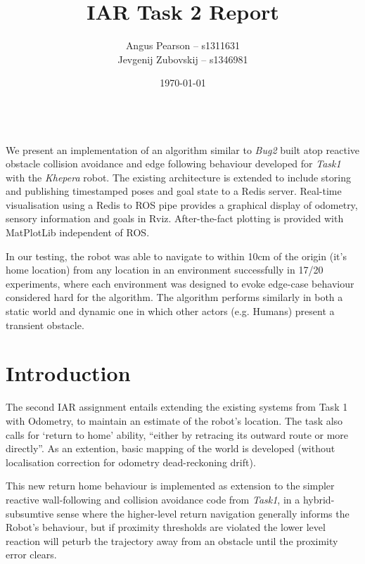 \documentclass[11pt, a4paper]{article}
\renewenvironment{abstract}{%
{\mdseries\scshape\Large\abstractname}
\vspace{1em}\\
}{\par\noindent}
\begin{document}
\title{IAR Task 2 Report}
\author{Angus Pearson -- s1311631\\ Jevgenij Zubovskij -- s1346981}
\date{\today}
\maketitle



\begin{abstract}
  We present an implementation of an algorithm similar to \textit{Bug2} \cite{principlesrobot} 
  built atop reactive obstacle collision avoidance and edge following behaviour developed for 
  \textit{Task1} with the \textit{Khepera} robot. The existing architecture is extended to
  include storing and publishing timestamped poses and goal state to a Redis \cite{Redis} server.
  Real-time visualisation using a Redis to ROS \cite{ROS} pipe provides a graphical display 
  of odometry, sensory information and goals in Rviz. After-the-fact plotting is provided 
  with MatPlotLib independent of ROS.

  In our testing, the robot was able to navigate to within 10cm of the origin (it's home location) 
  from any location in an environment successfully in 17/20 experiments, where each 
  environment was designed to evoke edge-case behaviour considered hard for the algorithm. The 
  algorithm performs similarly in both a static world and dynamic one in which other actors 
  (e.g. Humans) present a transient obstacle. 
\end{abstract}



\section{Introduction}
\label{Introduction}

The second IAR assignment entails extending the existing systems from Task 1 with Odometry, 
to maintain an estimate of the robot's location. The task also calls for `return to home' ability, 
``either by retracing its outward route or more directly''. As an extention, basic mapping 
of the world is developed (without localisation correction for odometry dead-reckoning drift). 

This new return home behaviour is implemented as extension to the simpler reactive wall-following
and collision avoidance code from \textit{Task1}\cite{task1_report}, in a hybrid-subsumtive sense 
where the higher-level return navigation generally informs the Robot's behaviour, but if proximity
thresholds are violated the lower level reaction will peturb the trajectory away from an obstacle
until the proximity error clears.
\end{document}
